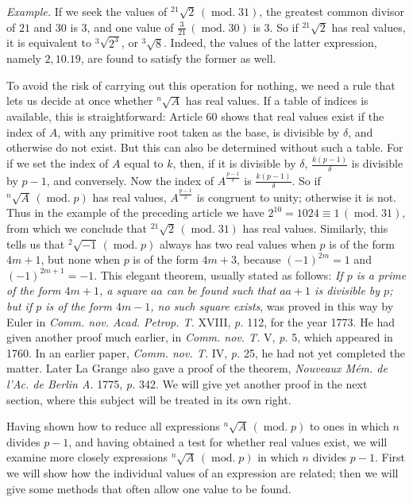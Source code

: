 \emph{Example.} If we seek the values of ${}^{21}\!\surd {2}\,(\operatorname{mod.}31)$, the greatest common divisor of $21$ and $30$ is $3$, and one value of $\frac{3}{21}\,(\operatorname{mod.}30)$ is $3$. So if ${}^{21}\!\surd {2}$ has real values, it is equivalent to ${}^{3}\!\surd {2^3}$, or ${}^{3}\!\surd {8}$. Indeed, the values of the latter expression, namely $2,10.19$, are found to satisfy the former as well.

To avoid the risk of carrying out this operation for nothing, we need a rule that lets us decide at once whether ${}^{n}\!\surd {A}$ has real values. If a table of indices is available, this is straightforward: Article 60 shows that real values exist if the index of $A$, with any primitive root taken as the base, is divisible by $\delta$, and otherwise do not exist. But this can also be determined without such a table. For if we set the index of $A$ equal to $k$, then, if it is divisible by $\delta$, $\frac{k(p-1)}{\delta}$ is divisible by $p-1$, and conversely. Now the index of $A^{\frac{p-1}{\delta}}$ is $\frac{k(p-1)}{\delta}$. So if ${}^{n}\!\surd {A}\,(\operatorname{mod.}p)$ has real values, $A^{\frac{p-1}{\delta}}$ is congruent to unity; otherwise it is not. Thus in the example of the preceding article we have $2^{10}=1024\equiv1\,(\operatorname{mod.}31)$, from which we conclude that ${}^{21}\!\surd {2}\,(\operatorname{mod.}31)$ has real values.
Similarly, this tells us that ${}^{2}\!\surd {-1}\,(\operatorname{mod.}p)$ always has two real values when $p$ is of the form $4m+1$, but none when $p$ is of the form $4m+3$, because $(-1)^{2m}=1$ and $(-1)^{2m+1}=-1$. This elegant theorem, usually stated as follows: \emph{If $p$ is a prime of the form $4m+1$, a square $aa$ can be found such that $aa+1$ is divisible by $p$; but if $p$ is of the form $4m-1$, no such square exists}, was proved in this way by Euler in \emph{Comm. nov. Acad. Petrop. T.} XVIII, \emph{p.} 112, for the year 1773. He had given another proof much earlier, in \emph{Comm. nov. T.} V, \emph{p.} 5, which appeared in 1760. In an earlier paper, \emph{Comm. nov. T.} IV, \emph{p.} 25, he had not yet
completed the matter. Later La Grange also gave a proof of the theorem, \emph{Nouveaux Mém. de l'Ac. de Berlin A.} 1775, \emph{p.} 342. We will give yet another proof in the next section, where this subject will be treated in its own right.

Having shown how to reduce all expressions ${}^{n}\!\surd {A}\,(\operatorname{mod.}p)$ to ones in which $n$ divides $p-1$, and having obtained a test for whether real values exist, we will examine more closely expressions ${}^{n}\!\surd {A}\,(\operatorname{mod.}p)$ in which $n$ divides $p-1$. First we will show how the individual values of an expression are related; then we will give some methods that often allow one value to be found.

